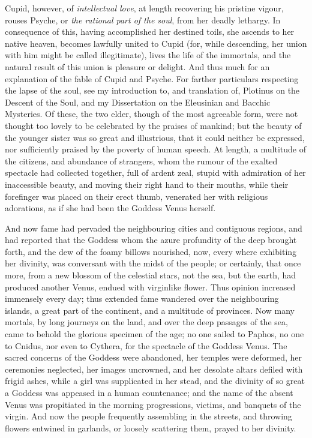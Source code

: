 \documentclass[12pt]{article}
\begin{document}
{Cupid, however, of \textit{intellectual love}, at length recovering his
pristine vigour, rouses Psyche, or \textit{the rational part of the soul}, from
her deadly lethargy. In consequence of this, having accomplished her destined
toils, she ascends to her native heaven, becomes lawfully united to Cupid (for,
while descending, her union with him might be called illegitimate), lives the
life of the immortals, and the natural result of this union is pleasure or
delight. And thus much for an explanation of the fable of Cupid and Psyche. For
farther particulars respecting the lapse of the soul, see my introduction to,
and translation of, Plotinus on the Descent of the Soul, and my Dissertation on
the Eleusinian and Bacchic Mysteries.} Of these, the two elder, though of the
most agreeable form, were not thought too lovely to be celebrated by the
praises of mankind; but the beauty of the younger sister was so great and
illustrious, that it could neither be expressed, nor sufficiently praised by
the poverty of human speech. At length, a multitude of the citizens, and
abundance of strangers, whom the rumour of the exalted spectacle had collected
together, full of ardent zeal, stupid with admiration of her inaccessible
beauty, and moving their right hand to their mouths, while their forefinger was
placed on their erect thumb, venerated her with religious adorations, as if she
had been the Goddess Venus herself.

And now fame had pervaded the neighbouring cities and contiguous regions, and
had reported that the Goddess whom the azure profundity of the deep brought
forth, and the dew of the foamy billows nourished, now, every where exhibiting
her divinity, was conversant with the midst of the people; or certainly, that
once more, from a new blossom of the celestial stars, not the sea, but the
earth, had produced another Venus, endued with virginlike flower. Thus opinion
increased immensely every day; thus extended fame wandered over the
neighbouring islands, a great part of the continent, and a multitude of
provinces. Now many mortals, by long journeys on the land, and over the deep
passages of the sea, came to behold the glorious specimen of the age; no one
sailed to Paphos, no one to Cnidus, nor even to Cythera, for the spectacle of
the Goddess Venus. The sacred concerns of the Goddess were abandoned, her
temples were deformed, her ceremonies neglected, her images uncrowned, and her
desolate altars defiled with frigid ashes, while a girl was supplicated in her
stead, and the divinity of so great a Goddess was appeased in a human
countenance; and the name of the absent Venus was propitiated in the morning
progressions, victims, and banquets of the virgin. And now the people
frequently assembling in the streets, and throwing flowers entwined in
garlands, or loosely scattering them, prayed to her divinity.
\end{document}
